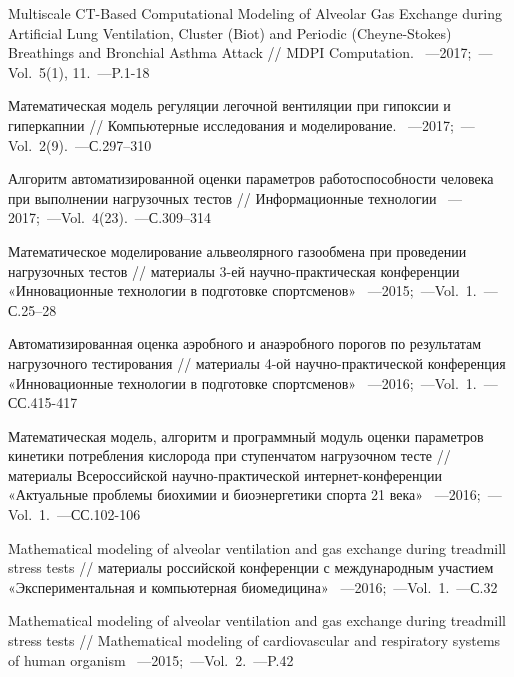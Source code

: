 \renewcommand{\refname}{\Large Публикации автора по теме диссертации}
\nocite{*}
\begin{thebibliography}{}
    
     Multiscale CT-Based Computational Modeling of Alveolar Gas Exchange during Artificial Lung Ventilation, Cluster (Biot) and Periodic (Cheyne-Stokes) Breathings and Bronchial Asthma Attack // MDPI Computation. ~---2017;~---Vol.~5(1), 11.~---P.1-18
    
     Математическая модель регуляции легочной вентиляции при гипоксии и гиперкапнии // Компьютерные исследования и моделирование. ~---2017;~---Vol.~2(9).~---С.297–310
    
     Алгоритм автоматизированной оценки параметров работоспособности человека при выполнении нагрузочных тестов // Информационные технологии ~---2017;~---Vol.~4(23).~---С.309–314

     Математическое моделирование альвеолярного газообмена при проведении нагрузочных тестов // материалы 3-ей научно-практическая конференции «Инновационные технологии в подготовке спортсменов» ~---2015;~---Vol.~1.~---С.25–28
    
     Автоматизированная оценка аэробного и анаэробного порогов по результатам нагрузочного тестирования // материалы 4-ой научно-практической конференция «Инновационные технологии в подготовке спортсменов» ~---2016;~---Vol.~1.~---СС.415-417
    
     Математическая модель, алгоритм и программный модуль оценки параметров кинетики потребления кислорода при ступенчатом нагрузочном тесте // материалы Всероссийской научно-практической интернет-конференции «Актуальные проблемы биохимии и биоэнергетики спорта 21 века» ~---2016;~---Vol.~1.~---СС.102-106

     Mathematical modeling of alveolar ventilation and gas exchange during treadmill stress tests // материалы российской конференции с международным участием «Экспериментальная и компьютерная биомедицина» ~---2016;~---Vol.~1.~---С.32
    
     Mathematical modeling of alveolar ventilation and gas exchange during treadmill stress tests // Mathematical modeling of cardiovascular and  respiratory systems of human organism ~---2015;~---Vol.~2.~---P.42
\end{thebibliography}

